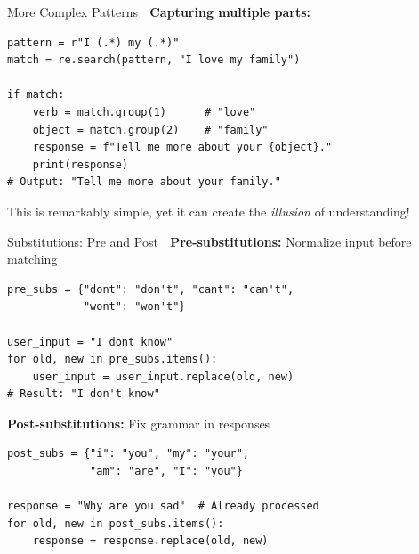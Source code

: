 \documentclass[aspectratio=169]{beamer}
\begin{document}
\begin{frame}[fragile]{More Complex Patterns 🎯}
\textbf{Capturing multiple parts:}

\begin{lstlisting}
pattern = r"I (.*) my (.*)"
match = re.search(pattern, "I love my family")

if match:
    verb = match.group(1)      # "love"
    object = match.group(2)    # "family"
    response = f"Tell me more about your {object}."
    print(response)
# Output: "Tell me more about your family."
\end{lstlisting}

\vspace{0.3cm}

\begin{thinkaboutit}
This is remarkably simple, yet it can create the \textit{illusion} of understanding!
\end{thinkaboutit}
\end{frame}

\begin{frame}[fragile]{Substitutions: Pre and Post 🔄}
\textbf{Pre-substitutions:} Normalize input before matching

\begin{lstlisting}
pre_subs = {"dont": "don't", "cant": "can't",
            "wont": "won't"}

user_input = "I dont know"
for old, new in pre_subs.items():
    user_input = user_input.replace(old, new)
# Result: "I don't know"
\end{lstlisting}

\vspace{0.3cm}

\textbf{Post-substitutions:} Fix grammar in responses

\begin{lstlisting}
post_subs = {"i": "you", "my": "your",
             "am": "are", "I": "you"}

response = "Why are you sad"  # Already processed
for old, new in post_subs.items():
    response = response.replace(old, new)
\end{lstlisting}
\end{frame}
\end{document}

